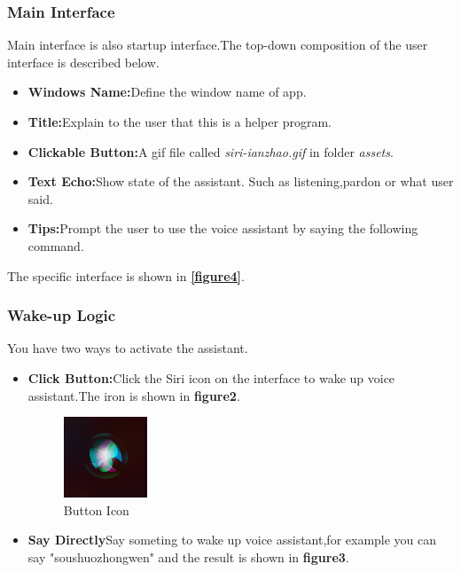 \documentclass{hci}
\begin{document}
\subsubsection{Main Interface}
Main interface is also startup interface.The top-down composition of the user interface is described below.
\begin{itemize}
	\item \textbf{Windows Name:}Define the window name of app.
	\item \textbf{Title:}Explain to the user that this is a helper program.
	\item \textbf{Clickable Button:}A gif file called \textit{siri-ianzhao.gif} in folder \textit{assets}.
	\item \textbf{Text Echo:}Show state of the assistant. Such as listening,pardon or what user said.
	\item \textbf{Tips:}Prompt the user to use the voice assistant by saying the following command.
\end{itemize}
The specific interface is shown in \textbf{\ref{figure4}}.


\subsubsection{Wake-up Logic}
You have two ways to activate the assistant.
\begin{itemize}
	\item \textbf{Click Button:}Click the Siri icon on the interface to wake up voice assistant.The iron is shown in \textbf{figure2}.
	\begin{figure}[htb]
		\centering
		\includegraphics[width=0.1\linewidth]{../picture/3}
		\caption{Button Icon}
		\label{figure2}
	\end{figure}
	\item \textbf{Say Directly}Say someting to wake up voice assistant,for example you can say "soushuozhongwen" and the result is shown in \textbf{figure3}.
		
\end{itemize}
\end{document}
